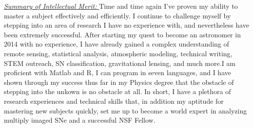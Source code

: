 \underline{\textit{Summary of Intellectual Merit: }} Time and time again I’ve proven my ability to master a subject effectively and efficiently. I continue to challenge myself by stepping into an area of research I have no experience with, and nevertheless have been extremely successful. After starting my quest to become an astronomer in 2014 with no experience, I have already gained a complex understanding of remote sensing, statistical analysis, atmospheric modeling, technical writing, STEM outreach, SN classification, gravitational lensing, and much more.I am proficient with Matlab and R, I can program in seven languages,
and I have shown through my success thus far in my Physics degree that
the obstacle  of stepping into  the unkown is  no obstacle at  all. In
short, I have a plethora  of research experiences and technical skills
that, in addition my aptitude  for mastering new subjects quickly, set
me up to become a world expert  in analyzing multiply imaged SNe and a
successful NSF Fellow.



